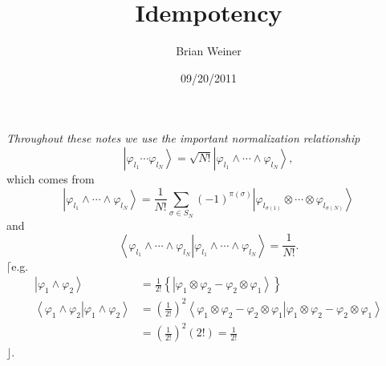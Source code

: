 \documentclass[aps,preprint]{revtex4}%
\begin{document}
\preprint{ }
\title[Idempotency]{Idempotency}
\author{Brian Weiner}
\author{}
\date{09/20/2011}


\qquad\bigskip\emph{Throughout these notes we use the important normalization
relationship}
\begin{equation}
\left\vert \varphi_{l_{1}}\cdots\varphi_{l_{N}}\right\rangle =\sqrt
{N!}\left\vert \varphi_{l_{1}}\wedge\cdots\wedge\varphi_{l_{N}}\right\rangle
,\label{normalization}%
\end{equation}
which comes from
\[
\left\vert \varphi_{l_{1}}\wedge\cdots\wedge\varphi_{l_{N}}\right\rangle
=\frac{1}{N!}\sum_{\sigma\in S_{N}}\left(  -1\right)  ^{\pi\left(
\sigma\right)  }\left\vert \varphi_{l_{\sigma\left(  1\right)  }}\otimes
\cdots\otimes\varphi_{l_{\sigma\left(  N\right)  }}\right\rangle
\]
and
\[
\left\langle \left.  \varphi_{l_{1}}\wedge\cdots\wedge\varphi_{l_{N}%
}\right\vert \varphi_{l_{1}}\wedge\cdots\wedge\varphi_{l_{N}}\right\rangle
=\frac{1}{N!}.
\]
$\lceil$e.g.%
\begin{align*}
\left\vert \varphi_{1}\wedge\varphi_{2}\right\rangle  &  =\frac{1}{2!}\left\{
\left\vert \varphi_{1}\otimes\varphi_{2}-\varphi_{2}\otimes\varphi
_{1}\right\rangle \right\}  \\
\left\langle \left.  \varphi_{1}\wedge\varphi_{2}\right\vert \varphi_{1}%
\wedge\varphi_{2}\right\rangle  &  =\left(  \frac{1}{2!}\right)
^{2}\left\langle \left.  \varphi_{1}\otimes\varphi_{2}-\varphi_{2}%
\otimes\varphi_{1}\right\vert \varphi_{1}\otimes\varphi_{2}-\varphi_{2}%
\otimes\varphi_{1}\right\rangle \\
&  =\left(  \frac{1}{2!}\right)  ^{2}\left(  2!\right)  =\frac{1}{2!}%
\end{align*}
$\rfloor.$
\end{document}
